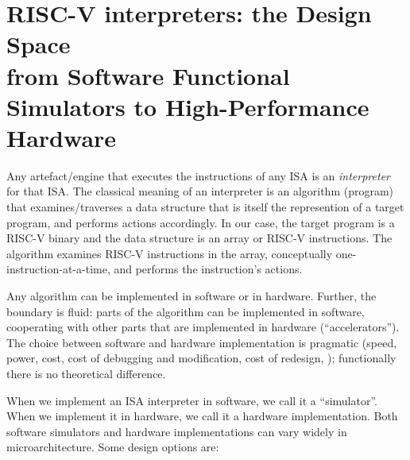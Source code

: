 

\chapter{RISC-V interpreters: the Design Space  \\
from Software Functional Simulators to High-Performance Hardware}


\setcounter{page}{1}
\renewcommand{\thepage}{\arabic{chapter}-\arabic{page}}

\label{ch_RISCV_Design_Space}


Any artefact/engine that executes the instructions of any ISA is an
\emph{interpreter} for that ISA. The classical meaning of an
interpreter is an algorithm (program) that examines/traverses a data
structure that is itself the represention of a target program, and
performs actions accordingly.  In our case, the target program is a
RISC-V binary and the data structure is an array or RISC-V
instructions.  The algorithm examines RISC-V instructions in the
array, conceptually one-instruction-at-a-time, and performs the
instruction's actions.

Any algorithm can be implemented in software or in hardware.  Further,
the boundary is fluid: parts of the algorithm can be implemented in
software, cooperating with other parts that are implemented in
hardware (``accelerators'').  The choice between software and hardware
implementation is pragmatic (speed, power, cost, cost of debugging and
modification, cost of redesign, {\etc}); functionally there is no
theoretical difference.

When we implement an ISA interpreter in software, we call it a
``simulator''.  When we implement it in hardware, we call it a
hardware implementation.  Both software simulators and hardware
implementations can vary widely in microarchitecture.  Some design
options are:

